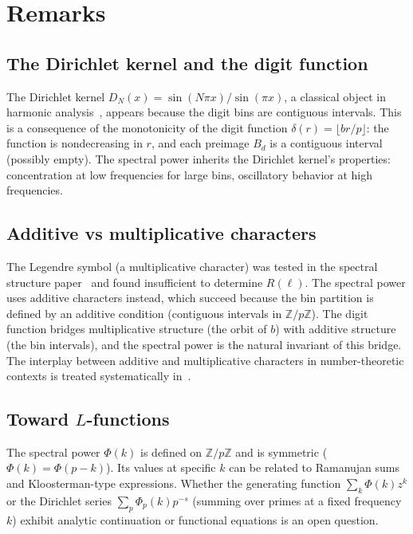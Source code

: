 \documentclass[12pt]{amsart}
\theoremstyle{definition}
\theoremstyle{remark}
\begin{document}
\section{Remarks}

\subsection*{The Dirichlet kernel and the digit function}

The Dirichlet kernel $D_N(x) = \sin(N\pi x)/\sin(\pi x)$, a
classical object in harmonic analysis~\cite{zygmund,iwaniec}, appears
because the digit bins are contiguous intervals. This is a
consequence of the monotonicity of the digit function
$\delta(r) = \lfloor br/p \rfloor$: the function is
nondecreasing in $r$, and each preimage $B_d$ is a
contiguous interval (possibly empty). The spectral power
inherits the Dirichlet kernel's properties: concentration at low
frequencies for large bins, oscillatory behavior at high
frequencies.

\subsection*{Additive vs multiplicative characters}

The Legendre symbol (a multiplicative character) was tested in
the spectral structure paper~\cite{paper7} and found insufficient
to determine $R(\ell)$. The
spectral power uses additive characters instead, which succeed
because the bin partition is defined by an additive condition
(contiguous intervals in $\mathbb{Z}/p\mathbb{Z}$). The digit
function bridges multiplicative structure (the orbit of $b$) with
additive structure (the bin intervals), and the spectral power is
the natural invariant of this bridge.  The interplay between
additive and multiplicative characters in number-theoretic contexts
is treated systematically in~\cite{iwaniec}.

\subsection*{Toward $L$-functions}

The spectral power $\Phi(k)$ is defined on
$\mathbb{Z}/p\mathbb{Z}$ and is symmetric ($\Phi(k) =
\Phi(p{-}k)$). Its values at specific $k$ can be related to
Ramanujan sums~\cite{ramanujan} and Kloosterman-type expressions. Whether the
generating function $\sum_k \Phi(k) z^k$ or the Dirichlet series
$\sum_p \Phi_p(k) p^{-s}$ (summing over primes at a fixed
frequency $k$) exhibit analytic continuation or functional
equations is an open question.
\end{document}
